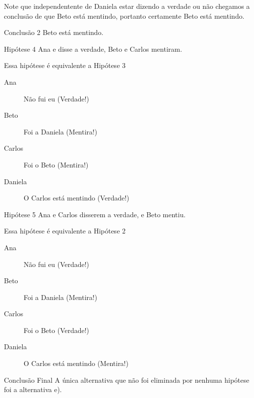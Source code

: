 \documentclass[10pt,aspectratio=169]{beamer}
\begin{document}
\begin{frame}[t]
	Note que independentente de Daniela estar dizendo a verdade ou não chegamos a conclusão de que Beto está mentindo, portanto certamente Beto está mentindo.
	\begin{conclusao}{Conclusão 2}
		Beto está mentindo.
	\end{conclusao}
\end{frame}

\begin{frame}[t]
	\begin{resultado}{Hipótese 4}
		Ana e disse a verdade, Beto e Carlos mentiram.
	\end{resultado}
	Essa hipótese é equivalente a Hipótese 3
	\begin{description}
		\item[Ana] Não fui eu \alert{(Verdade!)}
		\item[Beto] Foi a Daniela \alert{(Mentira!)}
		\item[Carlos] Foi o Beto \alert{(Mentira!)}
		\item[Daniela] O Carlos está mentindo \alert{(Verdade!)}
	\end{description}
\end{frame}

\begin{frame}[t]
	\begin{resultado}{Hipótese 5}
		Ana e Carlos disserem a verdade, e Beto mentiu.
	\end{resultado}
	Essa hipótese é equivalente a Hipótese 2
	\begin{description}
		\item[Ana] Não fui eu \alert{(Verdade!)}
		\item[Beto] Foi a Daniela \alert{(Mentira!)}
		\item[Carlos] Foi o Beto \alert{(Verdade!)}
		\item[Daniela] O Carlos está mentindo \alert{(Mentira!)}
	\end{description}
\end{frame}

\begin{frame}[t]
	\begin{conclusao}{Conclusão Final}
		A única alternativa que não foi eliminada por nenhuma hipótese foi a alternativa e).
	\end{conclusao}
\end{frame}
\end{document}
